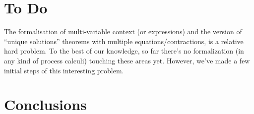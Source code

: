 \section{To Do}
\label{s:todo}


The formalisation of multi-variable context (or expressions) and the version of
``unique solutions'' theorems with multiple equations/contractions, is
a relative hard problem. To the best of our knowledge, so far there's no formalization (in any kind of
process calculi) touching these areas yet. However, we've made a few initial steps
of this interesting problem.



\section{Conclusions}
\label{s:concl}

